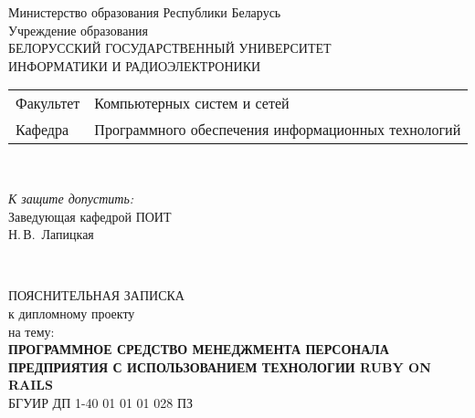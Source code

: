 \begin{titlepage}
  \begin{center}
    Министерство образования Республики Беларусь\\[1em]
    Учреждение образования\\
    БЕЛОРУССКИЙ ГОСУДАРСТВЕННЫЙ УНИВЕРСИТЕТ \\
    ИНФОРМАТИКИ И РАДИОЭЛЕКТРОНИКИ\\[1em]

    \begin{minipage}{\textwidth}
      \begin{flushleft}
        \begin{tabular}{ l l }
          Факультет & Компьютерных систем и сетей\\
          Кафедра   & Программного обеспечения информационных технологий
        \end{tabular}
      \end{flushleft}
    \end{minipage}\\[1em]

    \begin{flushright}
      \begin{minipage}{0.4\textwidth}
        \textit{К защите допустить:}\\[0.8em]
        Заведующая кафедрой ПОИТ\\[0.45em]
        \underline{\hspace*{2.8cm}} Н.\,В.~Лапицкая
      \end{minipage}\\[2.2em]
    \end{flushright}

    {ПОЯСНИТЕЛЬНАЯ ЗАПИСКА}\\
    {к дипломному проекту}\\
    {на тему:}\\[1em]
    \textbf{\large \MakeUppercase{Программное средство менеджмента персонала предприятия с использованием технологии Ruby on Rails}}\\[1em]


    {БГУИР ДП 1-40 01 01 01 028 ПЗ}\\[2em]
    

\end{center}
\end{titlepage}

